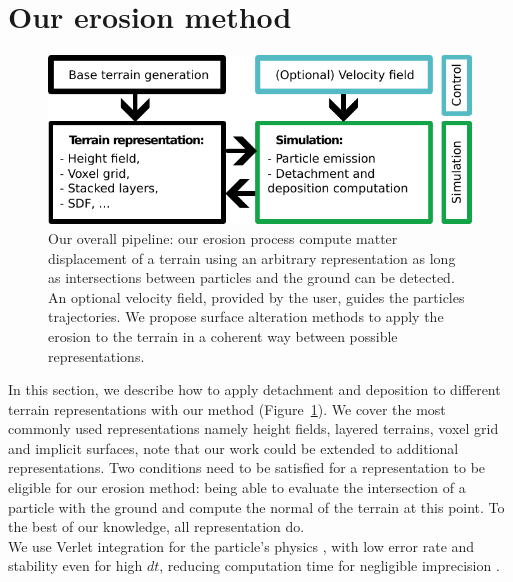 \section{Our erosion method}
\label{sec:application_on_representations}
\begin{figure}[t]
    \centering
    \includegraphics{figures/figure_pipeline.pdf}
    \caption{Our overall pipeline: our erosion process compute matter displacement of a terrain using an arbitrary representation as long as intersections between particles and the ground can be detected. An optional velocity field, provided by the user, guides the particles trajectories. We propose surface alteration methods to apply the erosion to the terrain in a coherent way between possible representations. }
    \label{Erosion-fig:figure_pipeline}
\end{figure}
In this section, we describe how to apply detachment and deposition to different terrain representations with our method (Figure~\ref{Erosion-fig:figure_pipeline}). We cover the most commonly used representations namely height fields, layered terrains, voxel grid and implicit surfaces, note that our work could be extended to additional representations. Two conditions need to be satisfied for a representation to be eligible for our erosion method: being able to evaluate the intersection of a particle with the ground and compute the normal of the terrain at this point. To the best of our knowledge, all representation do. \\
We use Verlet integration for the particle's physics  \cite{Verlet1967}, with low error rate and stability even for high $dt$, reducing computation time for negligible imprecision \cite{Baraff1998, Swope1982}.

